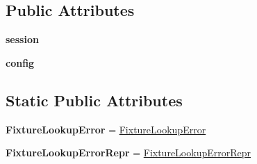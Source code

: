 \subsection*{Public Attributes}
\begin{DoxyCompactItemize}
\item 
\mbox{\label{class__pytest_1_1fixtures_1_1_fixture_manager_a80b11e3ef5e3e5f6c78aefd4ced98bb6}} 
{\bfseries session}
\item 
\mbox{\label{class__pytest_1_1fixtures_1_1_fixture_manager_aaeceaee280d7f90b89563168a5de180c}} 
{\bfseries config}
\end{DoxyCompactItemize}
\subsection*{Static Public Attributes}
\begin{DoxyCompactItemize}
\item 
\mbox{\label{class__pytest_1_1fixtures_1_1_fixture_manager_a4e11d94e67e0d5c284f6e8a604960af8}} 
{\bfseries Fixture\+Lookup\+Error} = \hyperlink{class__pytest_1_1fixtures_1_1_fixture_lookup_error}{Fixture\+Lookup\+Error}
\item 
\mbox{\label{class__pytest_1_1fixtures_1_1_fixture_manager_a2d6bbe5abd4525efdf6b2b1d4d15f908}} 
{\bfseries Fixture\+Lookup\+Error\+Repr} = \hyperlink{class__pytest_1_1fixtures_1_1_fixture_lookup_error_repr}{Fixture\+Lookup\+Error\+Repr}
\end{DoxyCompactItemize}


